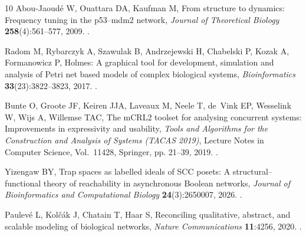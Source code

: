 \documentclass{ws-jbcb}
\numberwithin{equation}{section}
\begin{document}
\begin{thebibliography}{10}
Abou-Jaoud\'e W, Ouattara DA, Kaufman M, From structure to dynamics: Frequency
  tuning in the p53--mdm2 network, \emph{Journal of Theoretical Biology}
  \textbf{258}(4):561--577, 2009.
\newblock {}.

Radom M, Rybarczyk A, Szawulak B, Andrzejewski H, Chabelski P, Kozak A,
  Formanowicz P, Holmes: A graphical tool for development, simulation and
  analysis of {Petri} net based models of complex biological systems,
  \emph{Bioinformatics} \textbf{33}(23):3822--3823, 2017.
\newblock {}.

Bunte O, Groote JF, Keiren JJA, Laveaux M, Neele T, de~Vink EP, Wesselink W,
  Wijs A, Willemse TAC, The {mCRL2} toolset for analysing concurrent systems:
  Improvements in expressivity and usability,  \emph{Tools and Algorithms for
  the Construction and Analysis of Systems (TACAS 2019)}, Lecture Notes in
  Computer Science, Vol.~11428, Springer, pp. 21--39, 2019.
\newblock {}.

Yizengaw BY, Trap spaces as labelled ideals of {SCC} posets: A
  structural--functional theory of reachability in asynchronous {Boolean}
  networks, \emph{Journal of Bioinformatics and Computational Biology}
  \textbf{24}(3):2650007, 2026.
\newblock {}.

Paulev{\'e} L, Kol{\v{c}}{\'a}k J, Chatain T, Haar S, Reconciling qualitative,
  abstract, and scalable modeling of biological networks, \emph{Nature
  Communications} \textbf{11}:4256, 2020.
\newblock {}.

\end{thebibliography}
\end{document}
